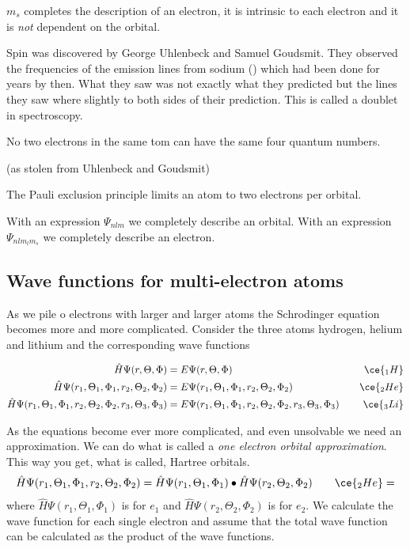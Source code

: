 \documentclass[../mit-general-chemistry.tex]{subfiles}
\begin{document}
$m_s$ completes the description of an electron, it is intrinsic to
each electron and it is {\em not} dependent on the orbital.

Spin was discovered by George Uhlenbeck and Samuel Goudsmit. They
observed the frequencies of the emission lines from sodium ()
which had been done for years by then. What they saw was not exactly
what they predicted but the lines they saw where slightly to both
sides of their prediction. This is called a doublet in spectroscopy.

\begin{definition}
  No two electrons in the same tom can have the same four quantum
  numbers.

  (as stolen from Uhlenbeck and Goudsmit)
\end{definition}

The Pauli exclusion principle limits an atom to two electrons per
orbital.

With an expression $\Psi_{nlm}$ we completely describe an
orbital. With an expression $\Psi_{nlm_lm_s}$ we completely describe
an electron.



\subsection{Wave functions for multi-electron atoms}



As we pile o electrons with larger and larger atoms the Schrodinger
equation becomes more and more complicated. Consider the three atoms
hydrogen, helium and lithium and the corresponding wave functions

\begin{align*}
  \hat{H}\Psi(r, \Theta, \Phi) &= E\Psi(r, \Theta, \Phi)&\quad\ce{{}_1H}\\
  \hat{H}\Psi(r_1, \Theta_1, \Phi_1, r_2, \Theta_2, \Phi_2) &= E\Psi(r_1, \Theta_1, \Phi_1, r_2, \Theta_2, \Phi_2)&\quad\ce{{}_2He}\\
  \hat{H}\Psi(r_1, \Theta_1, \Phi_1, r_2, \Theta_2, \Phi_2, r_3, \Theta_3, \Phi_3) &= E\Psi(r_1, \Theta_1, \Phi_1, r_2, \Theta_2, \Phi_2, r_3, \Theta_3, \Phi_3)&\quad\ce{{}_3Li}\\
\end{align*}

As the equations become ever more complicated, and even unsolvable we
need an approximation. We can do what is called a {\em one electron
  orbital approximation}. This way you get, what is called, Hartree
orbitals.
\begin{align*}
  \hat{H}\Psi(r_1, \Theta_1, \Phi_1, r_2, \Theta_2, \Phi_2) &=
  \hat{H}\Psi(r_1, \Theta_1, \Phi_1) \bullet \hat{H}\Psi(r_2, \Theta_2, \Phi_2)&\quad\ce{{}_2He}=\\
\end{align*}
where $\hat{H}\Psi(r_1, \Theta_1, \Phi_1)$ is for $e_1$ and
$\hat{H}\Psi(r_2, \Theta_2, \Phi_2)$ is for $e_2$. We calculate
the wave function for each single electron and assume that the total
wave function can be calculated as the product of the wave functions.
\end{document}
